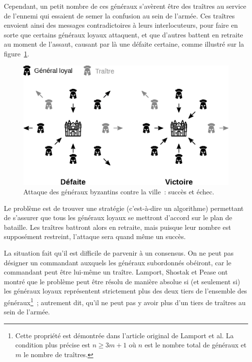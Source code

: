 Cependant, un petit nombre de ces généraux s'avèrent être des traîtres au service de l'ennemi qui essaient de semer la confusion au sein de l'armée. Ces traîtres envoient ainsi des messages contradictoires à leurs interlocuteurs, pour faire en sorte que certains généraux loyaux attaquent, et que d'autres battent en retraite au moment de l'assaut, causant par là une défaite certaine, comme illustré sur la figure~\ref{fig:byzantine-generals-attack}.

\begin{figure}[h]
  \centering
  \includegraphics[scale=0.7]{img/byzantine-generals-attack.eps}
  \caption{Attaque des généraux byzantins contre la ville~: succès et échec.}
  \label{fig:byzantine-generals-attack}
\end{figure}

Le problème est de trouver une stratégie (c'est-à-dire un algorithme) permettant de s'assurer que tous les généraux loyaux se mettront d'accord sur le plan de bataille. Les traîtres battront alors en retraite, mais puisque leur nombre est supposément restreint, l'attaque sera quand même un succès.

La situation fait qu'il est difficile de parvenir à un consensus. On ne peut pas désigner un commandant auxquels les généraux subordonnés obéiront, car le commandant peut être lui-même un traître. Lamport, Shostak et Pease ont montré que le problème peut être résolu de manière absolue si (et seulement si) les généraux loyaux représentent strictement plus des deux tiers de l'ensemble des généraux\footnote{Cette propriété est démontrée dans l'article original de Lamport et al. La condition plus précise est $n \ge 3 m + 1$ où $n$ est le nombre total de généraux et $m$ le nombre de traîtres.}~; autrement dit, qu'il ne peut pas y avoir plus d'un tiers de traîtres au sein de l'armée.

